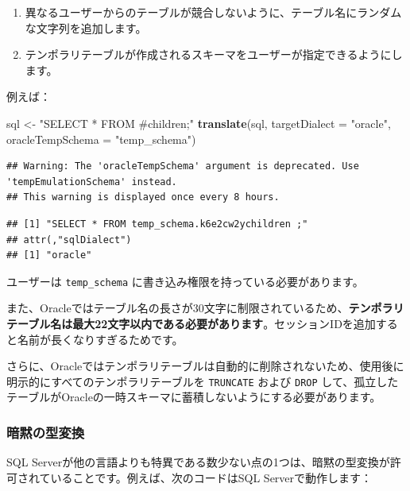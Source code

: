 \documentclass[
  11pt]{book}
\newenvironment{Shaded}{\begin{snugshade}}{\end{snugshade}}
\newcommand{\AttributeTok}[1]{\textcolor[rgb]{0.13,0.29,0.53}{#1}}
\newcommand{\FunctionTok}[1]{\textcolor[rgb]{0.13,0.29,0.53}{\textbf{#1}}}
\newcommand{\NormalTok}[1]{#1}
\newcommand{\OtherTok}[1]{\textcolor[rgb]{0.56,0.35,0.01}{#1}}
\newcommand{\StringTok}[1]{\textcolor[rgb]{0.31,0.60,0.02}{#1}}
\providecommand{\tightlist}{%
  \setlength{\itemsep}{0pt}\setlength{\parskip}{0pt}}
\theoremstyle{definition}
\theoremstyle{definition}
\theoremstyle{definition}
\theoremstyle{definition}
\theoremstyle{remark}
\begin{document}
\begin{enumerate}
\def\labelenumi{\arabic{enumi}.}
\tightlist
\item
  異なるユーザーからのテーブルが競合しないように、テーブル名にランダムな文字列を追加します。
\item
  テンポラリテーブルが作成されるスキーマをユーザーが指定できるようにします。
\end{enumerate}

例えば：

\begin{Shaded}
\begin{Highlighting}[]
\NormalTok{sql }\OtherTok{\textless{}{-}} \StringTok{"SELECT * FROM \#children;"}
\FunctionTok{translate}\NormalTok{(sql, }\AttributeTok{targetDialect =} \StringTok{"oracle"}\NormalTok{, }\AttributeTok{oracleTempSchema =} \StringTok{"temp\_schema"}\NormalTok{)}
\end{Highlighting}
\end{Shaded}

\begin{verbatim}
## Warning: The 'oracleTempSchema' argument is deprecated. Use 'tempEmulationSchema' instead.
## This warning is displayed once every 8 hours.
\end{verbatim}

\begin{verbatim}
## [1] "SELECT * FROM temp_schema.k6e2cw2ychildren ;"
## attr(,"sqlDialect")
## [1] "oracle"
\end{verbatim}

ユーザーは \texttt{temp\_schema} に書き込み権限を持っている必要があります。

また、Oracleではテーブル名の長さが30文字に制限されているため、\textbf{テンポラリテーブル名は最大22文字以内である必要があります}。セッションIDを追加すると名前が長くなりすぎるためです。

さらに、Oracleではテンポラリテーブルは自動的に削除されないため、使用後に明示的にすべてのテンポラリテーブルを \texttt{TRUNCATE} および \texttt{DROP} して、孤立したテーブルがOracleの一時スキーマに蓄積しないようにする必要があります。

\subsubsection*{暗黙の型変換}\label{ux6697ux9ed9ux306eux578bux5909ux63db}

SQL Serverが他の言語よりも特異である数少ない点の1つは、暗黙の型変換が許可されていることです。例えば、次のコードはSQL Serverで動作します：
\end{document}
